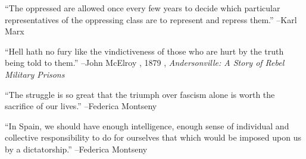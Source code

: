 \documentclass{article}%
\begin{document}
\linebreak%
\vspace{1mm}%
\begin{minipage}{\textwidth}%
\flushleft%
“The oppressed are allowed once every few years to decide which particular representatives of the oppressing class are to represent and repress them.”%
\linebreak%
\vspace{1mm}%
–Karl Marx%
\linebreak%
\vspace{1mm}%
\end{minipage}%
\linebreak%
\vspace{1mm}%
\begin{minipage}{\textwidth}%
\flushleft%
“Hell hath no fury like the vindictiveness of those who are hurt by the truth being told to them.”%
\linebreak%
\vspace{1mm}%
–John McElroy%
, 1879%
, \textit{Andersonville: A Story of Rebel Military Prisons}%
\linebreak%
\vspace{1mm}%
\end{minipage}%
\linebreak%
\vspace{1mm}%
\begin{minipage}{\textwidth}%
\flushleft%
“The struggle is so great that the triumph over fascism alone is worth the sacrifice of our lives.”%
\linebreak%
\vspace{1mm}%
–Federica Montseny%
\linebreak%
\vspace{1mm}%
\end{minipage}%
\linebreak%
\vspace{1mm}%
\begin{minipage}{\textwidth}%
\flushleft%
“In Spain, we should have enough intelligence, enough sense of individual and collective responsibility to do for ourselves that which would be imposed upon us by a dictatorship.”%
\linebreak%
\vspace{1mm}%
–Federica Montseny%
\linebreak%
\vspace{1mm}%
\end{minipage}%
\linebreak%
\vspace{1mm}%
\end{document}
